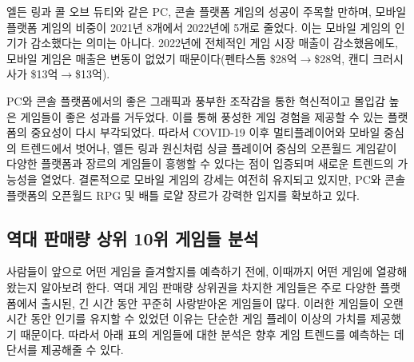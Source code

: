 \documentclass[a4paper, 11pt]{article}
\begin{document}
엘든 링과 콜 오브 듀티와 같은 PC, 콘솔 플랫폼 게임의 성공이 주목할 만하며, 모바일 플랫폼 게임의 비중이 2021년 8개에서 2022년에 5개로 줄었다. 이는 모바일 게임의 인기가 감소했다는 의미는 아니다. 2022년에 전체적인 게임 시장 매출이 감소했음에도, 모바일 게임은 매출은 변동이 없었기 때문이다(펜타스톰 \$28억\(\rightarrow\)\$28억, 캔디 크러시 사가 \$13억\(\rightarrow\)\$13억).

PC와 콘솔 플랫폼에서의 좋은 그래픽과 풍부한 조작감을 통한 혁신적이고 몰입감 높은 게임들이 좋은 성과를 거두었다. 이를 통해 풍성한 게임 경험을 제공할 수 있는 플랫폼의 중요성이 다시 부각되었다. 따라서 COVID-19 이후 멀티플레이어와 모바일 중심의 트렌드에서 벗어나, 엘든 링과 원신처럼 싱글 플레이어 중심의 오픈월드 게임같이 다양한 플랫폼과 장르의 게임들이 흥행할 수 있다는 점이 입증되며 새로운 트렌드의 가능성을 열었다. 결론적으로 모바일 게임의 강세는 여전히 유지되고 있지만, PC와 콘솔 플랫폼의 오픈월드 RPG 및 배틀 로얄 장르가 강력한 입지를 확보하고 있다.

\subsection{역대 판매량 상위 10위 게임들 분석}
사람들이 앞으로 어떤 게임을 즐겨할지를 예측하기 전에, 이때까지 어떤 게임에 열광해 왔는지 알아보려 한다. 역대 게임 판매량 상위권을 차지한 게임들은 주로 다양한 플랫폼에서 출시된, 긴 시간 동안 꾸준히 사랑받아온 게임들이 많다. 이러한 게임들이 오랜 시간 동안 인기를 유지할 수 있었던 이유는 단순한 게임 플레이 이상의 가치를 제공했기 때문이다. 따라서 아래 표의 게임들에 대한 분석은 향후 게임 트렌드를 예측하는 데 단서를 제공해줄 수 있다.

\begin{table}[h!]
    \caption{역대 판매량 상위 10위 게임 \cite{alltimetop10}}
\end{table}
\end{document}
